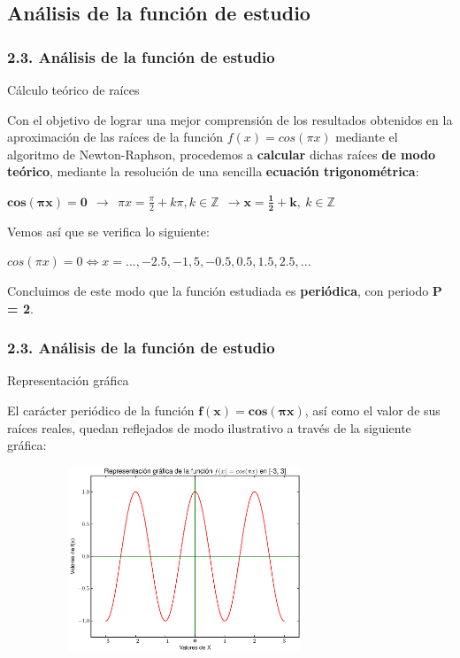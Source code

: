 \documentclass{beamer}
\begin{document}
\subsection{Análisis de la función de estudio}
\begin{frame}
\frametitle{2.3. Análisis de la función de estudio}
\begin{block}{Cálculo teórico de raíces}

Con el objetivo de lograr una mejor comprensión de los resultados obtenidos en la aproximación de
las raíces de la función $f(x) = cos (\pi x)$ mediante el algoritmo de Newton-Raphson, procedemos 
a \textbf{calcular} dichas raíces \textbf{de modo teórico}, mediante la resolución de una sencilla 
\textbf{ecuación trigonométrica}: \pause
    \begin{center}
    $\boldsymbol{cos (\pi x) = 0} \ \ \to \ \ \pi x = \frac{\pi}{2} + k \pi, k \in \mathbb{Z} \ \ \to 
    \boldsymbol{x = \frac{1}{2} + k}, \ k \in \mathbb{Z}$
    \end{center}

\pause
Vemos así que se verifica lo siguiente:
    \begin{center}
    $cos (\pi x) = 0 \iff x = ..., -2.5, -1,5, -0.5, 0.5, 1.5, 2.5, ...$
    \end{center}

\pause
Concluimos de este modo que la función estudiada es \textbf{periódica}, con periodo \textbf{P = 2}. 

\end{block}
\end{frame}


\begin{frame}
\frametitle{2.3. Análisis de la función de estudio}
\begin{block}{Representación gráfica}

El carácter periódico de la función $\boldsymbol{f(x) = cos (\pi x)}$, así como el valor de sus 
raíces reales, quedan reflejados de modo ilustrativo a través de la siguiente gráfica: 

\vspace*{-3mm}

\begin{figure}[!th]
\begin{center}\includegraphics[height=5.5cm, width=8.5cm]{images/cos.eps}
\label{cos}
\end{center}
\end{figure}

\end{block}
\end{frame}
\end{document}
